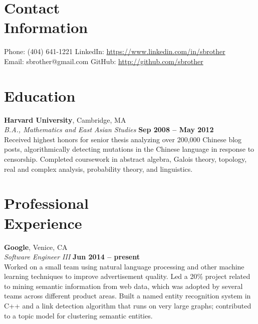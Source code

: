 \documentclass[margin,line]{resume}
\begin{document}
\begin{resume}
    \section{\mysidestyle Contact\\Information}

    Phone: (404) 641-1221       \hfill LinkedIn: \url{https://www.linkedin.com/in/sbrother} \\
    \noindent Email: sbrother@gmail.com  \hfill GitHub: \url{http://github.com/sbrother} \vspace{0mm}\\\vspace{-4.5mm}

    \section{\mysidestyle Education}

    \textbf{Harvard University}, Cambridge, MA \vspace{2mm}\\\vspace{1mm}%
    \textsl{B.A., Mathematics and East Asian Studies} \hfill \textbf{Sep 2008 -- May 2012}\\
    Received highest honors for senior thesis analyzing over 200,000 Chinese blog posts, algorithmically detecting mutations in the Chinese language in response to censorship. Completed coursework in abstract algebra, Galois theory, topology, real and complex analysis, probability theory, and linguistics.

    \section{\mysidestyle Professional\\Experience}

    \textbf{Google}, Venice, CA \vspace{2mm}\\\vspace{1mm}%
    \textsl{Software Engineer III} \hfill \textbf{Jun 2014 -- present}\\
    Worked on a small team using natural language processing and other machine learning techniques to improve advertisement quality. Led a 20\% project related to mining semantic information from web data, which was adopted by several teams across different product areas. Built a named entity recognition system in C++ and a link detection algorithm that runs on very large graphs; contributed to a topic model for clustering semantic entities.


\end{resume}
\end{document}
